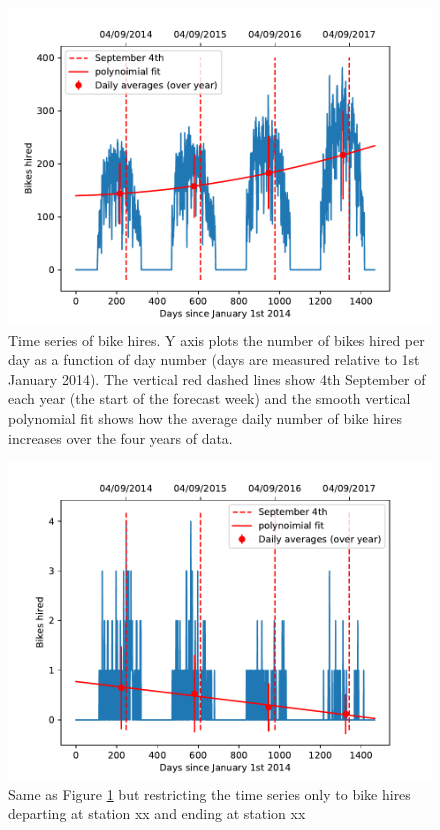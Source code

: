 \documentclass[10pt]{article}
\begin{document}
\begin{figure}
\begin{center}
\includegraphics[scale=1.0,angle=0,trim=0cm 0cm 0cm 0cm]{ts_plot.pdf}
\caption{Time series of bike hires. Y axis plots the number of bikes hired per day as a function of day number (days are measured relative to 1st January 2014). The vertical red dashed lines show 4th September of each year (the start of the forecast week) and the smooth vertical polynomial fit shows how the average daily number of bike hires increases over the four years of data.}
\label{fig_ts}
\end{center}
\end{figure}
\begin{figure}
\begin{center}
\includegraphics[scale=1.0,angle=0,trim=0cm 0cm 0cm 0cm]{ts_plot_station.pdf}
\caption{Same as Figure \ref{fig_ts} but restricting the time series only to bike hires departing at station xx and ending at station xx}
\label{fig_ts_station}
\end{center}
\end{figure}
\end{document}
